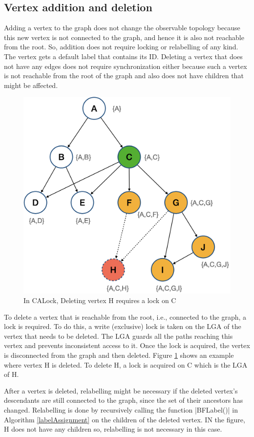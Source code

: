 \subsection{Vertex addition and deletion}
Adding a vertex to the graph does not change the observable topology because this new vertex is not connected to the graph, and hence it is also not reachable from the root. 
So, addition does not require locking or relabelling of any kind. The vertex gets a default label that contains its ID. 
Deleting a vertex that does not have any edges does not require synchronization either because such a vertex is not reachable from the root of the graph and also does not have children that might be affected.

\begin{figure}[h]
	\centering
	\captionsetup{justification=centering}
	\includegraphics[width=.6\columnwidth]{figures/CALock_to_delete_vertex.png}
	\caption{In CALock, Deleting vertex H requires a lock on C}
	\label{calockdelete}
\end{figure}

To delete a vertex that is reachable from the root, i.e., connected to the graph, a lock is required. 
To do this, a write (exclusive) lock is taken on the LGA of the vertex that needs to be deleted. 
The LGA guards all the paths reaching this vertex and prevents inconsistent access to it. 
Once the lock is acquired, the vertex is disconnected from the graph and then deleted. Figure \ref{calockdelete} shows an example where vertex H is deleted. To delete H, a lock is acquired on C which is the LGA of H.

After a vertex is deleted, relabelling might be necessary if the deleted vertex's descendants are still connected to the graph, since the set of their ancestors has changed. Relabelling is done by recursively calling the function \inline|BFLabel()| in Algorithm \ref{labelAssignment} on the children of the deleted vertex. 
IN the figure, H does not have any children so, relabelling is not necessary in this case.

